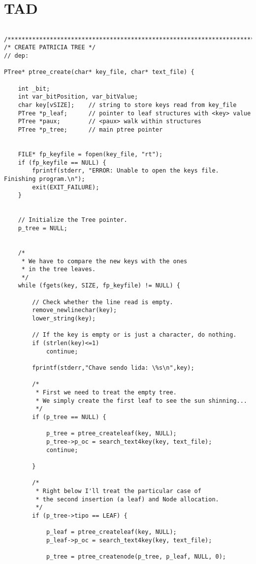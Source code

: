 \documentclass[a4paper,10pt]{article}
\begin{document}
\section*{TAD}
\begin{verbatim}

/******************************************************************************/
/* CREATE PATRICIA TREE */
// dep:

PTree* ptree_create(char* key_file, char* text_file) {

    int _bit;
    int var_bitPosition, var_bitValue;
    char key[vSIZE];    // string to store keys read from key_file
    PTree *p_leaf;      // pointer to leaf structures with <key> value
    PTree *paux;        // <paux> walk within structures
    PTree *p_tree;      // main ptree pointer


    FILE* fp_keyfile = fopen(key_file, "rt");
    if (fp_keyfile == NULL) {
        fprintf(stderr, "ERROR: Unable to open the keys file. Finishing program.\n");
        exit(EXIT_FAILURE);
    }


    // Initialize the Tree pointer.
    p_tree = NULL;


    /*
     * We have to compare the new keys with the ones
     * in the tree leaves.
     */
    while (fgets(key, SIZE, fp_keyfile) != NULL) {

        // Check whether the line read is empty.
        remove_newlinechar(key);
        lower_string(key);

        // If the key is empty or is just a character, do nothing.
        if (strlen(key)<=1)
            continue;

        fprintf(stderr,"Chave sendo lida: \%s\n",key);

        /*
         * First we need to treat the empty tree.
         * We simply create the first leaf to see the sun shinning...
         */
        if (p_tree == NULL) {

            p_tree = ptree_createleaf(key, NULL);
            p_tree->p_oc = search_text4key(key, text_file);
            continue;

        }

        /*
         * Right below I'll treat the particular case of
         * the second insertion (a leaf) and Node allocation.
         */
        if (p_tree->tipo == LEAF) {

            p_leaf = ptree_createleaf(key, NULL);
            p_leaf->p_oc = search_text4key(key, text_file);

            p_tree = ptree_createnode(p_tree, p_leaf, NULL, 0);


\end{verbatim}
\end{document}
